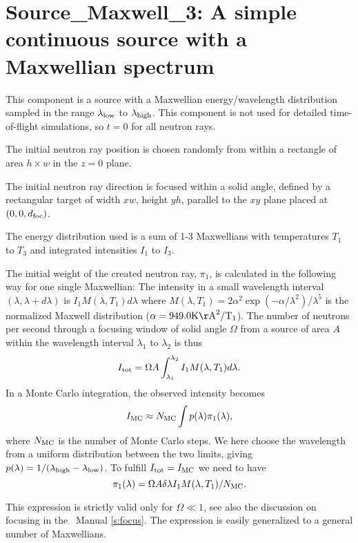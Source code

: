 \section{Source\_Maxwell\_3: A simple continuous source 
with a Maxwellian spectrum}
\label{source-maxwell}


This component is a source with a Maxwellian energy/wavelength distribution 
sampled in the range $\lambda_{\rm low}$ to $\lambda_{\rm high}$.
This component is not used for detailed time-of-flight simulations,
so $t=0$ for all neutron rays.

The initial neutron ray position is chosen randomly from within a
rectangle of area $h \times w$ in the $z=0$ plane. 

The initial neutron ray direction is focused within
a solid angle, defined by a rectangular target of width
$xw$, height $yh$, parallel to 
the $xy$ plane placed at $(0,0,d_{\rm foc})$. 

The energy distribution used is a sum of 1-3 Maxwellians with
temperatures $T_1$ to $T_3$ and integrated intensities $I_1$ to $I_3$.

The initial weight of the created neutron ray, $\pi_1$, is 
calculated in the following way for one single Maxwellian:
The intensity in a small wavelength interval $(\lambda, \lambda+d\lambda)$ is
$ I_1 M(\lambda,T_1) d\lambda $
where 
$M(\lambda,T_1) = 2 \alpha^2 \exp(-\alpha/\lambda^2) / \lambda^5 $ is the normalized Maxwell distribution ($\alpha=949.0 \rm{K \AA}^2/T_1$).
The number of neutrons per second through a focusing window 
of solid angle $\Omega$
from a source of area $A$ within the wavelength interval $\lambda_1$ to
$\lambda_2$ is thus
\begin{equation}
I_{\rm tot} = \Omega A \int_{\lambda_1}^{\lambda_2} I_1 M(\lambda,T_1) d\lambda.
\end{equation}
In a Monte Carlo integration, the observed intensity becomes
\begin{equation}
I_{\rm MC} \approx N_{\rm MC} \int p(\lambda) \pi_1(\lambda) ,
\end{equation}
where $N_{\rm MC}$ is the number of Monte Carlo steps. 
We here choose the wavelength from a uniform distribution between the two
limits, giving $p(\lambda)=1/(\lambda_{\rm high}-\lambda_{\rm low})$.
To fulfill $I_{\rm tot} = I_{\rm MC}$ we need to have
\begin{equation}
\pi_1(\lambda) = \Omega A \delta\lambda I_1 M(\lambda,T_1) / N_{\rm MC} .
\end{equation}

This expression is strictly valid only for $\Omega \ll 1$, 
see also the discussion on focusing in the \MCS\ Manual \ref{s:focus}. 
The expression is easily generalized to a general number of Maxwellians.
